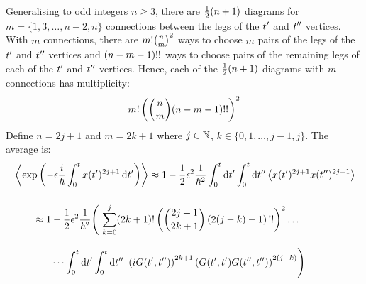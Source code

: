 Generalising to odd integers $n \geq 3$, there are $\frac{1}{2} (n + 1)$ diagrams
for\\ $m = \{1, 3, \dots, n-2, n\}$ connections between the legs of the ${t^{\prime}}$
and ${t^{\prime\prime}}$ vertices.
With $m$ connections, there are $m{!} \binom{n}{m}^2$ ways to choose $m$
pairs of the legs of the ${t^{\prime}}$ and ${t^{\prime\prime}}$ vertices and $(n - m - 1){!!}$
ways to choose pairs of the remaining legs of each of the ${t^{\prime}}$ and ${t^{\prime\prime}}$
vertices.
Hence, each of the $\frac{1}{2} (n + 1)$ diagrams with $m$ connections has multiplicity:
\begin{equation*}
  m{!} \left( \binom{n}{m} (n - m - 1){!!} \right)^2
\end{equation*}
Define $n = 2j + 1$ and $m = 2k + 1$ where $j \in \mathbb{N}$, $k \in \{0, 1, \dots, j
  - 1, j\}$.
The average is:
\begin{align*}
   & \left\langle{\exp\left(-\epsilon\frac{i}{\hbar}\int_0^t x({t^{\prime}})^{2j + 1} \,\text{d}{}{{t^{\prime}}}\right)}\right\rangle
  \approx 1
  - \frac{1}{2}\epsilon^2\frac{1}{\hbar^2}
  \int_0^t\text{d}{}{{t^{\prime}}} \int_0^t\text{d}{}{{t^{\prime\prime}}}
  \left\langle{x({t^{\prime}})^{2j + 1} x({t^{\prime\prime}})^{2j + 1}}\right\rangle
  \\[3ex]
   & \qquad \approx 1
  - \frac{1}{2}\epsilon^2\frac{1}{\hbar^2}\Biggl(\
  \sum_{k=0}^{j}
  (2k + 1){!} \left( \binom{2j + 1}{2k + 1} \left(2(j - k) - 1\right){!!} \right)^2
  \dots
  \\[2ex]
   & \qquad\qquad \dots
  \int_0^t\text{d}{}{{t^{\prime}}} \int_0^t\text{d}{}{{t^{\prime\prime}}}\
  \left(iG({t^{\prime}}, {t^{\prime\prime}})\right)^{2k + 1}
  \left(G({t^{\prime}}, {t^{\prime}}) G({t^{\prime\prime}}, {t^{\prime\prime}})\right)^{2(j - k)}
  \Biggr)
\end{align*}
